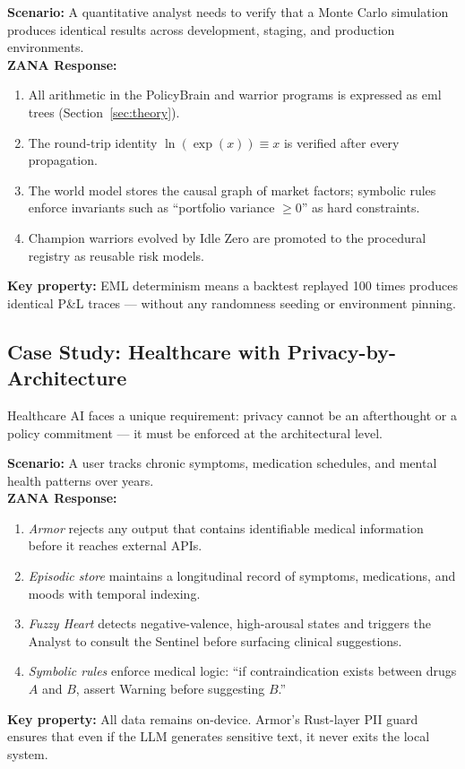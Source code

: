 \documentclass[12pt,a4paper]{article}
\begin{document}
\begin{tcolorbox}[defbox, title={Use Case: Deterministic Financial Modeling}]
\textbf{Scenario:} A quantitative analyst needs to verify that a Monte Carlo simulation
produces identical results across development, staging, and production environments.\\[4pt]
\textbf{ZANA Response:}
\begin{enumerate}[leftmargin=*, itemsep=0pt]
  \item All arithmetic in the PolicyBrain and warrior programs is expressed as $\mathrm{eml}$
    trees (Section~\ref{sec:theory}).
  \item The round-trip identity $\ln(\exp(x)) \equiv x$ is verified after every propagation.
  \item The world model stores the causal graph of market factors; symbolic rules enforce
    invariants such as ``portfolio variance $\geq 0$'' as hard constraints.
  \item Champion warriors evolved by Idle Zero are promoted to the procedural registry as
    reusable risk models.
\end{enumerate}
\textbf{Key property:} EML determinism means a backtest replayed 100 times produces
identical P\&L traces --- without any randomness seeding or environment pinning.
\end{tcolorbox}

\subsection{Case Study: Healthcare with Privacy-by-Architecture}

Healthcare AI faces a unique requirement: privacy cannot be an afterthought or a policy
commitment --- it must be enforced at the architectural level.

\begin{tcolorbox}[defbox, title={Use Case: Privacy-Preserving Health Companion}]
\textbf{Scenario:} A user tracks chronic symptoms, medication schedules, and mental
health patterns over years.\\[4pt]
\textbf{ZANA Response:}
\begin{enumerate}[leftmargin=*, itemsep=0pt]
  \item \textit{Armor} rejects any output that contains identifiable medical information
    before it reaches external APIs.
  \item \textit{Episodic store} maintains a longitudinal record of symptoms, medications,
    and moods with temporal indexing.
  \item \textit{Fuzzy Heart} detects negative-valence, high-arousal states and triggers
    the Analyst to consult the Sentinel before surfacing clinical suggestions.
  \item \textit{Symbolic rules} enforce medical logic: ``if contraindication exists between
    drugs $A$ and $B$, assert Warning before suggesting $B$.''
\end{enumerate}
\textbf{Key property:} All data remains on-device. Armor's Rust-layer PII guard ensures
that even if the LLM generates sensitive text, it never exits the local system.
\end{tcolorbox}
\end{document}
